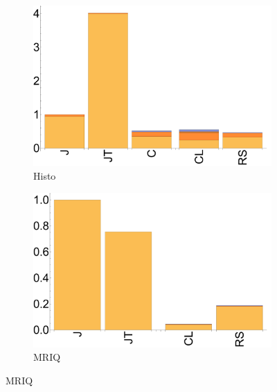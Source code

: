 \begin{figure}[ht]
  \begin{subfigure}[b]{0.3\textwidth}
      \includegraphics[width=\textwidth]{data/bbattery_histogram_nexus5.pdf}
      \caption{Histo}\label{fig:b_histo}
  \end{subfigure}

  \begin{subfigure}[b]{0.3\textwidth}
      \includegraphics[width=\textwidth]{data/bbattery_mriq_nexus5.pdf}
      \caption{MRIQ} \label{fig:b_MRIQ}
  \end{subfigure}


\end{figure}
